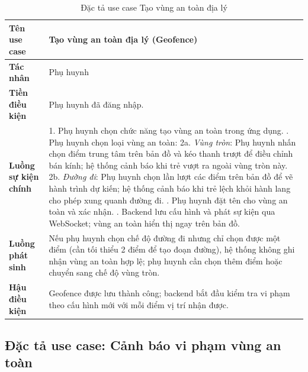 \documentclass[../DoAn.tex]{subfiles}
\begin{document}
\begin{table}[H]
\centering
\caption{Đặc tả use case Tạo vùng an toàn địa lý}
\label{table:uc_geofence}
\begin{tabular}{|l|p{9.5cm}|}
\hline
\textbf{Tên use case}       & Tạo vùng an toàn địa lý (Geofence) \\
\hline
\textbf{Tác nhân}           & Phụ huynh \\
\hline
\textbf{Tiền điều kiện}     & Phụ huynh đã đăng nhập. \\
\hline
\textbf{Luồng sự kiện chính} &
1. Phụ huynh chọn chức năng tạo vùng an toàn trong ứng dụng. \newline
2. Phụ huynh chọn loại vùng an toàn: \newline
\hspace{1em}2a. \textit{Vùng tròn}: Phụ huynh nhấn chọn điểm trung tâm trên bản đồ và kéo thanh trượt để điều chỉnh bán kính; hệ thống cảnh báo khi trẻ vượt ra ngoài vùng tròn này. \newline
\hspace{1em}2b. \textit{Đường đi}: Phụ huynh chọn lần lượt các điểm trên bản đồ để vẽ hành trình dự kiến; hệ thống cảnh báo khi trẻ lệch khỏi hành lang cho phép xung quanh đường đi. \newline
3. Phụ huynh đặt tên cho vùng an toàn và xác nhận. \newline
4. Backend lưu cấu hình và phát sự kiện qua WebSocket; vùng an toàn hiển thị ngay trên bản đồ. \\
\hline
\textbf{Luồng phát sinh}    & Nếu phụ huynh chọn chế độ đường đi nhưng chỉ chọn được một điểm (cần tối thiểu 2 điểm để tạo đoạn đường), hệ thống không ghi nhận vùng an toàn hợp lệ; phụ huynh cần chọn thêm điểm hoặc chuyển sang chế độ vùng tròn. \\
\hline
\textbf{Hậu điều kiện}      & Geofence được lưu thành công; backend bắt đầu kiểm tra vi phạm theo cấu hình mới với mỗi điểm vị trí nhận được. \\
\hline
\end{tabular}
\end{table}

\subsection{Đặc tả use case: Cảnh báo vi phạm vùng an toàn}
\end{document}
